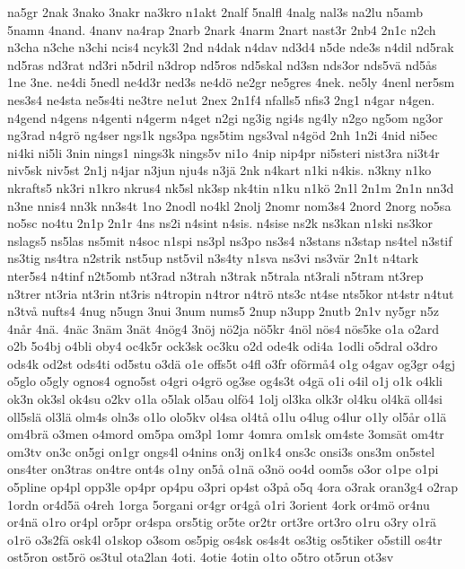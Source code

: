 {{na5gr
2nak
3nako
3nakr
na3kro
n1akt
2nalf
5nalfl
4nalg
nal3s
na2lu
n5amb
5namn
4nand.
4nanv
na4rap
2narb
2nark
4narm
2nart
nast3r
2nb4
2n1c
n2ch
n3cha
n3che
n3chi
ncis4
ncyk3l
2nd
n4dak
n4dav
nd3d4
n5de
nde3s
n4dil
nd5rak
nd5ras
nd3rat
nd3ri
n5dril
n3drop
nd5ros
nd5skal
nd3sn
nds3or
nds5v^^e4
nd5^^e5s
1ne
3ne.
ne4di
5nedl
ne4d3r
ned3s
ne4d^^f6
ne2gr
ne5gres
4nek.
ne5ly
4nenl
ner5sm
nes3s4
ne4sta
ne5s4ti
ne3tre
ne1ut
2nex
2n1f4
nfalls5
nfis3
2ng1
n4gar
n4gen.
n4gend
n4gens
n4genti
n4germ
n4get
n2gi
ng3ig
ngi4s
ng4ly
n2go
ng5om
ng3or
ng3rad
n4gr^^f6
ng4ser
ngs1k
ngs3pa
ngs5tim
ngs3val
n4g^^f6d
2nh
1n2i
4nid
ni5ec
ni4ki
ni5li
3nin
nings1
nings3k
nings5v
ni1o
4nip
nip4pr
ni5steri
nist3ra
ni3t4r
niv5sk
niv5st
2n1j
n4jar
n3jun
nju4s
n3j^^e4
2nk
n4kart
n1ki
n4kis.
n3kny
n1ko
nkrafts5
nk3ri
n1kro
nkrus4
nk5sl
nk3sp
nk4tin
n1ku
n1k^^f6
2n1l
2n1m
2n1n
nn3d
n3ne
nnis4
nn3k
nn3s4t
1no
2nodl
no4kl
2nolj
2nomr
nom3s4
2nord
2norg
no5sa
no5sc
no4tu
2n1p
2n1r
4ns
ns2i
n4sint
n4sis.
n4sise
ns2k
ns3kan
n1ski
ns3kor
nslags5
ns5las
ns5mit
n4soc
n1spi
ns3pl
ns3po
ns3s4
n3stans
n3stap
ns4tel
n3stif
ns3tig
ns4tra
n2strik
nst5up
nst5vil
n3s4ty
n1sva
ns3vi
ns3v^^e4r
2n1t
n4tark
nter5s4
n4tinf
n2t5omb
nt3rad
n3trah
n3trak
n5trala
nt3rali
n5tram
nt3rep
n3trer
nt3ria
nt3rin
nt3ris
n4tropin
n4tror
n4tr^^f6
nts3c
nt4se
nts5kor
nt4str
n4tut
n3tv^^e5
nufts4
4nug
n5ugn
3nui
3num
nums5
2nup
n3upp
2nutb
2n1v
ny5gr
n5z
4n^^e5r
4n^^e4.
4n^^e4c
3n^^e4m
3n^^e4t
4n^^f6g4
3n^^f6j
n^^f62ja
n^^f65kr
4n^^f6l
n^^f6s4
n^^f6s5ke
o1a
o2ard
o2b
5o4bj
o4bli
oby4
oc4k5r
ock3sk
oc3ku
o2d
ode4k
odi4a
1odli
o5dral
o3dro
ods4k
od2st
ods4ti
od5stu
o3d^^e4
o1e
offs5t
o4fl
o3fr
of^^f6rm^^e54
o1g
o4gav
og3gr
o4gj
o5glo
o5gly
ognos4
ogno5st
o4gri
o4gr^^f6
og3se
og4s3t
o4g^^e4
o1i
o4il
o1j
o1k
o4kli
ok3n
ok3sl
ok4su
o2kv
o1la
o5lak
ol5au
olf^^f64
1olj
ol3ka
olk3r
ol4ku
ol4k^^e4
oll4si
oll5sl^^e4
ol3l^^e4
olm4s
oln3s
o1lo
olo5kv
ol4sa
ol4t^^e5
o1lu
o4lug
o4lur
o1ly
ol5^^e5r
o1l^^e4
om4br^^e4
o3men
o4mord
om5pa
om3pl
1omr
4omra
om1sk
om4ste
3oms^^e4t
om4tr
om3tv
on3c
on5gi
on1gr
ongs4l
o4nins
on3j
on1k4
ons3c
onsi3s
ons3m
on5stel
ons4ter
on3tras
on4tre
ont4s
o1ny
on5^^e5
o1n^^e4
o3n^^f6
oo4d
oom5s
o3or
o1pe
o1pi
o5pline
op4pl
opp3le
op4pr
op4pu
o3pri
op4st
o3p^^e5
o5q
4ora
o3rak
oran3g4
o2rap
1ordn
or4d5^^e4
o4reh
1orga
5organi
or4gr
or4g^^e5
o1ri
3orient
4ork
or4m^^f6
or4nu
or4n^^e4
o1ro
or4pl
or5pr
or4spa
ors5tig
or5te
or2tr
ort3re
ort3ro
o1ru
o3ry
o1r^^e4
o1r^^f6
o3s2f^^e4
osk4l
o1skop
o3som
os5pig
os4sk
os4s4t
os3tig
os5tiker
o5still
os4tr
ost5ron
ost5r^^f6
os3tul
ota2lan
4oti.
4otie
4otin
o1to
o5tro
ot5run
ot3sv
}}

